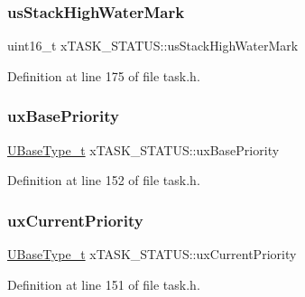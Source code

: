 \subsubsection{\texorpdfstring{us\+Stack\+High\+Water\+Mark}{usStackHighWaterMark}\hspace{0.1cm}{\footnotesize\ttfamily [2/2]}}
{\footnotesize\ttfamily uint16\+\_\+t x\+T\+A\+S\+K\+\_\+\+S\+T\+A\+T\+U\+S\+::us\+Stack\+High\+Water\+Mark}



Definition at line 175 of file task.\+h.

\mbox{\label{structx_t_a_s_k___s_t_a_t_u_s_a692f4c8957b7270f1579cdee63ff287e}} 
\subsubsection{\texorpdfstring{ux\+Base\+Priority}{uxBasePriority}}
{\footnotesize\ttfamily \hyperlink{externals_2freertos_2portable_2_g_c_c_2_a_r_m___c_m0_2portmacro_8h_a646f89d4298e4f5afd522202b11cb2e6}{U\+Base\+Type\+\_\+t} x\+T\+A\+S\+K\+\_\+\+S\+T\+A\+T\+U\+S\+::ux\+Base\+Priority}



Definition at line 152 of file task.\+h.

\mbox{\label{structx_t_a_s_k___s_t_a_t_u_s_a39df647234fc0d6de5852042a2741a94}} 
\subsubsection{\texorpdfstring{ux\+Current\+Priority}{uxCurrentPriority}}
{\footnotesize\ttfamily \hyperlink{externals_2freertos_2portable_2_g_c_c_2_a_r_m___c_m0_2portmacro_8h_a646f89d4298e4f5afd522202b11cb2e6}{U\+Base\+Type\+\_\+t} x\+T\+A\+S\+K\+\_\+\+S\+T\+A\+T\+U\+S\+::ux\+Current\+Priority}



Definition at line 151 of file task.\+h.

